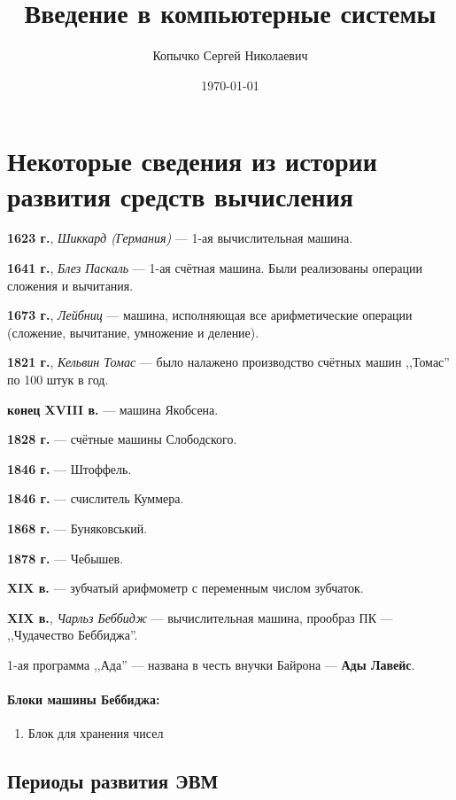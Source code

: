 \documentclass[10pt,a4paper,titlepage]{article}
\author{Копычко Сергей Николаевич}
\title{Введение в компьютерные системы}
\date{\today}
\begin{document}
\maketitle

\newpage
\tableofcontents

\newpage
\section{Некоторые сведения из истории развития средств вычисления}

\textbf{1623 г.}, \textit{Шиккард (Германия)} --- 1-ая вычислительная машина.

\textbf{1641 г.}, \textit{Блез Паскаль} --- 1-ая счётная машина. Были реализованы операции сложения и вычитания.

\textbf{1673 г.}, \textit{Лейбниц} --- машина, исполняющая все арифметические операции (сложение, вычитание, умножение и деление).

\textbf{1821 г.}, \textit{Кельвин Томас} --- было налажено производство счётных машин ,,Томас'' по 100 штук в год.

\textbf{конец XVIII в.} --- машина Якобсена.

\textbf{1828 г.} --- счётные машины Слободского.

\textbf{1846 г.} --- Штоффель.

\textbf{1846 г.} --- счислитель Куммера.

\textbf{1868 г.} --- Буняковський.

\textbf{1878 г.} --- Чебышев.

\textbf{XIX в.} --- зубчатый арифмометр с переменным числом зубчаток.

\textbf{XIX в.}, \textit{Чарльз Беббидж} --- вычислительная машина, прообраз ПК --- ,,Чудачество Беббиджа''.

1-ая программа ,,Ада'' --- названа в честь внучки Байрона --- \textbf{Ады Лавейс}.

\paragraph{Блоки машины Беббиджа:}
\begin{enumerate}
\item Блок для хранения чисел

\end{enumerate}

\subsection{Периоды развития ЭВМ}
\end{document}
